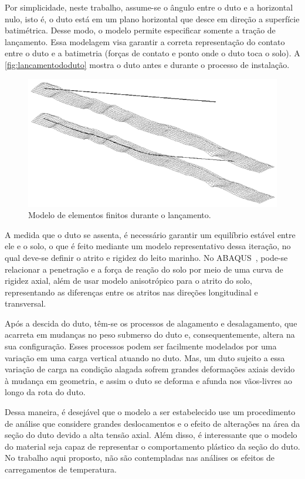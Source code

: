 Por simplicidade, neste trabalho, assume-se o ângulo entre o duto e a horizontal nulo, isto é, o duto está em um plano horizontal que desce em direção a superfície batimétrica.
Desse modo, o modelo permite especificar somente a tração de lançamento.
Essa modelagem visa garantir a correta representação do contato entre o duto e a batimetria (forças de contato e ponto onde o duto toca o solo).
A \autoref{fig:lancamentododuto} mostra o duto antes e durante o processo de instalação.

\begin{figure}[!ht]
    \centering
    \caption{Modelo de elementos finitos durante o lançamento.}\label{fig:lancamentododuto}
    \includegraphics[width=0.7\linewidth]{imagens/lancamento_do_duto}
\end{figure}

A medida que o duto se assenta, é necessário garantir um equilíbrio estável entre ele e o solo, o que é feito mediante um modelo representativo dessa iteração, no qual deve-se definir o atrito e rigidez do leito marinho.
No ABAQUS~\cite{Dassault2018}, pode-se relacionar a penetração e a força de reação do solo por meio de uma curva de rigidez axial, além de usar modelo anisotrópico para o atrito do solo, representando as diferenças entre os atritos nas direções longitudinal e transversal.

Após a descida do duto, têm-se os processos de alagamento e desalagamento, que acarreta em mudanças no peso submerso do duto e, consequentemente, altera na sua configuração.
Esses processos podem ser facilmente modelados por uma variação em uma carga vertical atuando no duto.
Mas, um duto sujeito a essa variação de carga na condição alagada sofrem grandes deformações axiais devido à mudança em geometria, e assim o duto se deforma e afunda nos vãos-livres ao longo da rota do duto.

Dessa maneira, é desejável que o modelo a ser estabelecido use um procedimento de análise que considere grandes deslocamentos e o efeito de alterações na área da seção do duto devido a alta tensão axial.
Além disso, é interessante que o modelo do material seja capaz de representar o comportamento plástico da seção do duto. No trabalho aqui proposto, não são contempladas nas análises os efeitos de carregamentos de temperatura.

